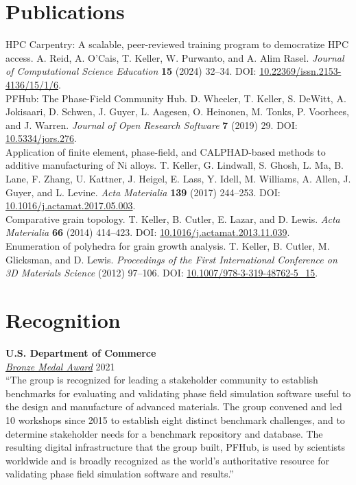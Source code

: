 \documentclass[margin]{res}
\begin{document}
\begin{resume}
\end{resume}\newpage\begin{resume}\section{Publications}
HPC Carpentry: A scalable, peer-reviewed training program to democratize HPC access. A. Reid, A. O'Cais, T. Keller, W. Purwanto, and A. Alim Rasel. \textit{Journal of Computational Science Education} {\bf 15} (2024) 32--34. DOI: \href{https://doi.org/10.22369/issn.2153-4136/15/1/6}{10.22369/issn.2153-4136/15/1/6}.\\[0.25\baselineskip]
PFHub: The Phase-Field Community Hub.
 D. Wheeler, T. Keller, S. DeWitt, A. Jokisaari, D. Schwen, J. Guyer, L. Aagesen, O. Heinonen, M. Tonks, P. Voorhees, and J. Warren.
 \textit{Journal of Open Research Software} {\bf 7} (2019) 29. DOI: \href{https://doi.org/10.5334/jors.276}{10.5334/jors.276}.\\[0.25\baselineskip]
Application of finite element, phase-field, and CALPHAD-based methods to additive manufacturing of Ni alloys.
 T. Keller, G. Lindwall, S. Ghosh, L. Ma, B. Lane, F. Zhang, U. Kattner, J. Heigel, E. Lass, Y. Idell, M. Williams, A. Allen, J. Guyer, and L. Levine.
 \textit{Acta Materialia} {\bf 139} (2017) 244--253. DOI: \href{https://doi.org/10.1016/j.actamat.2017.05.003}{10.1016/j.actamat.2017.05.003}.\\[0.25\baselineskip]
Comparative grain topology.
 T. Keller, B. Cutler, E. Lazar, and D. Lewis. \textit{Acta Materialia} {\bf 66} (2014) 414--423. DOI: \href{https://doi.org/10.1016/j.actamat.2013.11.039}{10.1016/j.actamat.2013.11.039}.\\[0.25\baselineskip]
Enumeration of polyhedra for grain growth analysis.
 T. Keller, B. Cutler, M. Glicksman, and D. Lewis. \textit{Proceedings of the First International Conference on 3D Materials Science} (2012) 97--106. DOI: \href{https://doi.org/10.1007/978-3-319-48762-5_15}{10.1007/978-3-319-48762-5\_15}.\\[0.25\baselineskip]

\section{Recognition}
{\bf U.S. Department of Commerce}\\[0.25\baselineskip]
\href{https://www.nist.gov/nist-awards/2021-bronze-medal-award-daniel-wheeler-trevor-keller-jonathan-guyer-james-warren}{\textit{Bronze Medal Award}} \hfill{}2021\\
``The group is recognized for leading a stakeholder community to establish benchmarks for evaluating and validating phase field simulation software useful to the design and manufacture of advanced materials. The group convened and led 10 workshops since 2015 to establish eight distinct benchmark challenges, and to determine stakeholder needs for a benchmark repository and database. The resulting digital infrastructure that the group built, PFHub, is used by scientists worldwide and is broadly recognized as the world’s authoritative resource for validating phase field simulation software and results.''



\end{resume}
\end{document}
